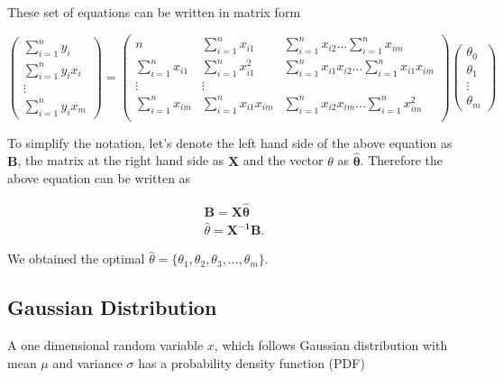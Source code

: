 \documentclass[english]{tktltiki}
\begin{document}
These set of equations can be written in matrix form

$$
\begin{pmatrix}
\sum_{i=1}^n y_i \\
\sum_{i=1}^n y_i x_i \\
\vdots \\
\sum_{i=1}^n y_i x_m
\end{pmatrix}
=%
\begin{pmatrix}
n & \sum_{i=1}^n x_{i1} & \sum_{i=1}^n x_{i2} \hdots \sum_{i=1}^n x_{im} \\
\sum_{i=1}^n x_{i1} & \sum_{i=1}^n x_{i1}^2 & \sum_{i=1}^n x_{i1} x_{i2} \hdots \sum_{i=1}^n x_{i1} x_{im} \\
\vdots&\vdots \\
\sum_{i=1}^n x_{im} & \sum_{i=1}^n x_{i1} x_{im} & \sum_{i=1}^n x_{i2} x_{im} \hdots \sum_{i=1}^n x_{im}^2 \\
\end{pmatrix}
%
\begin{pmatrix}
\theta_0 \\
\theta_1 \\
\vdots \\
\theta_m
\end{pmatrix}
\label{eq:lin_reg_matrix}
$$

To simplify the notation, let's denote the left hand side of the above equation as $\mathbf{B}$, the matrix at the right hand side as $\mathbf{X}$ and the vector $\theta$ as $\hat{\mathbf{\theta}}$. Therefore the above equation can be written as

\begin{eqnarray}
\mathbf{B} = \mathbf{X \hat{\theta}} \nonumber \\
\hat{\theta} = \mathbf{X^{-1}} \mathbf{B}.
\label{reg_param}
\end{eqnarray}

We obtained the optimal $\hat{\theta} = \{\theta_1, \theta_2, \theta_3, ...,\theta_m\}$.

\subsection{Gaussian Distribution}

A one dimensional random variable $x$, which follows Gaussian distribution with mean $\mu$ and variance $\sigma$ has a probability density function (PDF)
\end{document}
